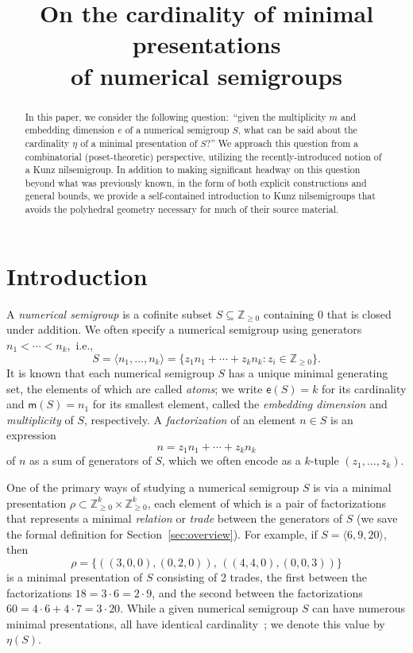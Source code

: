\documentclass[ALCO]{cedram}
\title
[On the cardinality of minimal presentations]
{On the cardinality of minimal presentations \\ of numerical semigroups}
\author[\initial{C.} \lastname{Elmacioglu}]{\firstname{Ceyhun} \lastname{Elmacioglu}}
\author[\initial{K.} \lastname{Hilmer}]{\firstname{Kieran} \lastname{Hilmer}}
\author[\initial{C.} \lastname{O'Neill}]{\firstname{Christopher} \lastname{O'Neill}}
\author[\initial{M.} \lastname{Okandan}]{\firstname{Melin} \lastname{Okandan}}
\author[\initial{H.} \lastname{Park-Kaufmann}]{\firstname{Hannah} \lastname{Park-Kaufmann}}
\newcommand\ZZ{\mathbb{Z}}
\begin{document}
\begin{abstract}
In this paper, we consider the following question:\ ``given the multiplicity $m$ and embedding dimension $e$ of a numerical semigroup $S$, what can be said about the cardinality $\eta$ of a minimal presentation of $S$?''  We approach this question from a combinatorial (poset-theoretic) perspective, utilizing the recently-introduced notion of a Kunz nilsemigroup.  In addition to making significant headway on this question beyond what was previously known, in the form of both explicit constructions and general bounds, we provide a self-contained introduction to Kunz nilsemigroups that avoids the polyhedral geometry necessary for much of their source material.  
\end{abstract}


\maketitle


\section{Introduction}
\label{sec:intro}

\noindent
A \emph{numerical semigroup} is a cofinite subset $S \subseteq \ZZ_{\ge 0}$ containing 0 that is closed under addition.  We often specify a numerical semigroup using generators $n_1 < \cdots < n_k$,~i.e.,
\[
S = \langle n_1, \ldots, n_k \rangle = \{z_1 n_1 + \cdots + z_k n_k : z_i \in \ZZ_{\ge 0}\}.
\]
It is known that each numerical semigroup $S$ has a unique minimal generating set, the elements of which are called \emph{atoms}; we write $\mathsf e(S) = k$ for its cardinality and $\mathsf m(S) = n_1$ for its smallest element, called the \emph{embedding dimension} and \emph{multiplicity} of $S$, respectively.  A \emph{factorization} of an element $n \in S$ is an expression 
$$n = z_1 n_1 + \cdots + z_k n_k$$
of $n$ as a sum of generators of $S$, which we often encode as a $k$-tuple $(z_1, \ldots, z_k)$.  

One of the primary ways of studying a numerical semigroup $S$ is via a minimal presentation $\rho \subset \ZZ_{\ge 0}^k \times \ZZ_{\ge 0}^k$, each element of which is a pair of factorizations that represents a minimal \emph{relation} or \emph{trade} between the generators of $S$ (we save the formal definition for Section~\ref{sec:overview}).  For example, if $S = \langle 6,9,20 \rangle$, then 
$$\rho = \{((3,0,0), (0,2,0)), \, ((4,4,0), (0,0,3))\}$$
is a minimal presentation of $S$ consisting of 2 trades, the first between the factorizations $18 = 3 \cdot 6 = 2 \cdot 9$, and the second between the factorizations $60 = 4 \cdot 6 + 4 \cdot 7 = 3 \cdot 20$.  While a given numerical semigroup $S$ can have numerous minimal presentations, all have identical cardinality~\cite{fingenmon}; we denote this value by $\eta(S)$.  
\end{document}
